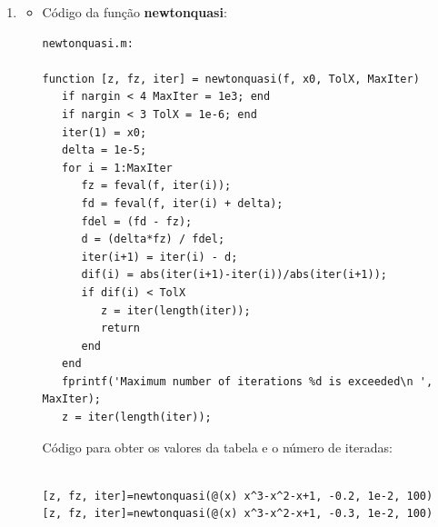 \documentclass[a4paper,10pt]{extarticle}
\begin{document}
\begin{enumerate}
\item 
\begin{itemize} 
\item Código da função {\bf newtonquasi}:
{\small
\begin{verbatim}
newtonquasi.m:

function [z, fz, iter] = newtonquasi(f, x0, TolX, MaxIter)
   if nargin < 4 MaxIter = 1e3; end
   if nargin < 3 TolX = 1e-6; end
   iter(1) = x0;
   delta = 1e-5;
   for i = 1:MaxIter
      fz = feval(f, iter(i));
      fd = feval(f, iter(i) + delta);
      fdel = (fd - fz);
      d = (delta*fz) / fdel;
      iter(i+1) = iter(i) - d;
      dif(i) = abs(iter(i+1)-iter(i))/abs(iter(i+1));
      if dif(i) < TolX
	     z = iter(length(iter));
         return
      end
   end   
   fprintf('Maximum number of iterations %d is exceeded\n ', MaxIter); 
   z = iter(length(iter));

\end{verbatim}
}
Código para obter os valores da tabela e o número de iteradas:
{\small
\begin{verbatim}

[z, fz, iter]=newtonquasi(@(x) x^3-x^2-x+1, -0.2, 1e-2, 100)
[z, fz, iter]=newtonquasi(@(x) x^3-x^2-x+1, -0.3, 1e-2, 100)


\end{verbatim}}
\end{itemize}
\end{enumerate}
\end{document}
